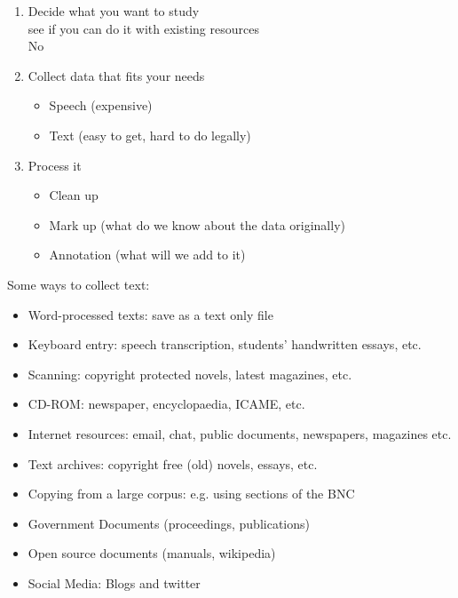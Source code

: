 \documentclass[a4paper,landscape,headrule,footrule,dvips]{foils}
\begin{document}
\begin{CJK}{UTF8}{min}

\begin{enumerate}
\item Decide what you want to study
\\ see if you can do it with existing resources
\\ No \frownie
\item Collect data that fits your needs
  \begin{itemize}
  \item Speech (expensive)
  \item Text (easy to get, hard to do legally)
  \end{itemize}
\item Process it
  \begin{itemize}
  \item Clean up
  \item Mark up (what do we know about the data originally)
  \item Annotation (what will we add to it)
  \end{itemize}
\end{enumerate}


Some ways to collect text:

\begin{itemize}\addtolength{\itemsep}{-1ex}
\item Word-processed texts: save as a text only file
\item Keyboard entry: speech transcription, students' handwritten essays, etc.
\item Scanning: copyright protected novels, latest magazines, etc.
\item CD-ROM: newspaper, encyclopaedia, ICAME, etc.
\item Internet resources: email, chat, public documents, newspapers, magazines etc.
\item  Text archives: copyright free (old) novels, essays, etc.
\item Copying from a large corpus: e.g. using sections of the BNC
\end{itemize}

\begin{itemize}
\item Government Documents (proceedings, publications)
\item Open source documents (manuals, wikipedia)
\item Social Media:  Blogs and twitter
\end{itemize}


\end{CJK}
\end{document}
